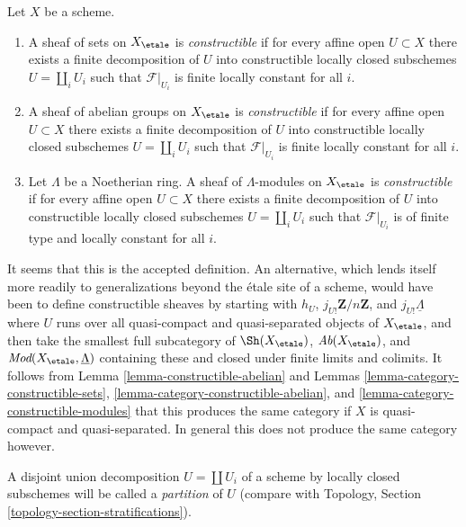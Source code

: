 \begin{definition}
\label{definition-constructible}
Let $X$ be a scheme.
\begin{enumerate}
\item A sheaf of sets on $X_\etale$ is {\it constructible}
if for every affine open $U \subset X$ there exists a finite decomposition
of $U$ into constructible locally closed subschemes $U = \coprod_i U_i$
such that $\mathcal{F}|_{U_i}$ is finite locally constant for all $i$.
\item A sheaf of abelian groups on $X_\etale$ is {\it constructible}
if for every affine open $U \subset X$ there exists a finite decomposition
of $U$ into constructible locally closed subschemes $U = \coprod_i U_i$
such that $\mathcal{F}|_{U_i}$ is finite locally constant for all $i$.
\item Let $\Lambda$ be a Noetherian ring. A sheaf of $\Lambda$-modules
on $X_\etale$ is {\it constructible} if for every affine open
$U \subset X$ there exists a finite decomposition
of $U$ into constructible locally closed subschemes
$U = \coprod_i U_i$ such that
$\mathcal{F}|_{U_i}$ is of finite type and locally constant for all $i$.
\end{enumerate}
\end{definition}

\noindent
It seems that this is the accepted definition. An alternative, which lends
itself more readily to generalizations beyond the \'etale site of a scheme,
would have been to define constructible sheaves by starting with
$h_U$, $j_{U!}\mathbf{Z}/n\mathbf{Z}$, and $j_{U!}\underline{\Lambda}$
where $U$ runs over all quasi-compact and quasi-separated objects
of $X_\etale$, and then take the smallest full subcategory of
$\Sh(X_\etale)$, $\textit{Ab}(X_\etale)$, and
$\textit{Mod}(X_\etale, \underline{\Lambda})$ containing these
and closed under finite limits and colimits. It follows from
Lemma \ref{lemma-constructible-abelian}
and
Lemmas \ref{lemma-category-constructible-sets},
\ref{lemma-category-constructible-abelian}, and
\ref{lemma-category-constructible-modules}
that this produces the same category if $X$ is quasi-compact and
quasi-separated. In general this does not produce the same
category however.

\medskip\noindent
A disjoint union decomposition $U = \coprod U_i$ of a scheme by
locally closed subschemes will be called a {\it partition} of $U$
(compare with Topology, Section \ref{topology-section-stratifications}).

